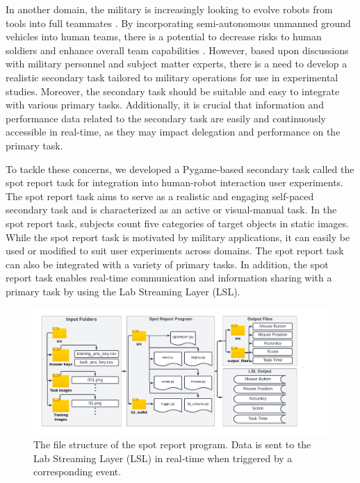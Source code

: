 \documentclass[preprint,12pt, a4paper]{elsarticle}
\begin{document}
In another domain, the military is increasingly looking to evolve robots from tools into full teammates \cite{DoDroadmap}. By incorporating semi-autonomous unmanned ground vehicles into human teams, there is a potential to decrease risks to human soldiers and enhance overall team capabilities \cite{watson2005autonomous}. However, based upon discussions with military personnel and subject matter experts, there is a need to develop a realistic secondary task tailored to military operations for use in experimental studies. Moreover, the secondary task should be suitable and easy to integrate with various primary tasks. Additionally, it is crucial that information and performance data related to the secondary task are easily and continuously accessible in real-time, as they may impact delegation and performance on the primary task. \vspace{2mm}

To tackle these concerns, we developed a Pygame-based secondary task called the spot report task for integration into human-robot interaction user experiments. The spot report task aims to serve as a realistic and engaging self-paced secondary task and is characterized as an active or visual-manual task. In the spot report task, subjects count five categories of target objects in static images. While the spot report task is motivated by military applications, it can easily be used or modified to suit user experiments across domains. The spot report task can also be integrated with a variety of primary tasks. In addition, the spot report task enables real-time communication and information sharing with a primary task by using the Lab Streaming Layer (LSL).

\begin{figure}[t]
  \centering  \includegraphics[width=1\linewidth]{Figures/file_structure.pdf}    
  \caption{The file structure of the spot report program. Data is sent to the Lab Streaming Layer (LSL) in real-time when triggered by a corresponding event.}
  \label{fig:file_structure}
\end{figure}
\end{document}
